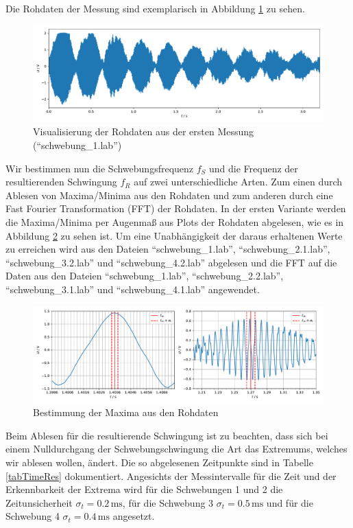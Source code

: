 Die Rohdaten der Messung sind exemplarisch in Abbildung \ref{rohSch} zu sehen.

\begin{figure}[h]
	\centering
	\includegraphics[width=\linewidth]{plots/rohdaten_schwebung.pdf}
	\caption{Visualisierung der Rohdaten aus der ersten Messung (\mbox{``schwebung\_1.lab''})}
	\label{rohSch}
\end{figure}

Wir bestimmen nun die Schwebungsfrequenz $f_S$ und die Frequenz der resultierenden Schwingung $f_R$ auf zwei unterschiedliche Arten. Zum einen durch Ablesen von Maxima/Minima aus den Rohdaten und zum anderen durch eine Fast Fourier Transformation (FFT) der Rohdaten. 
In der ersten Variante werden die Maxima/Minima per Augenmaß aus Plots der Rohdaten abgelesen, wie es in Abbildung \ref{MaxAblesen} zu sehen ist. Um eine Unabhängigkeit der daraus erhaltenen Werte zu erreichen wird aus den Dateien \mbox{``schwebung\_1.lab''}, \mbox{``schwebung\_2.1.lab''}, \mbox{``schwebung\_3.2.lab''} und \mbox{``schwebung\_4.2.lab''} abgelesen und die FFT auf die Daten aus den Dateien \mbox{``schwebung\_1.lab''}, \mbox{``schwebung\_2.2.lab''}, \\
\mbox{``schwebung\_3.1.lab''} und \mbox{``schwebung\_4.1.lab''} angewendet.

\begin{figure}[H]
	\centering
	\includegraphics[width=\linewidth]{plots/bspMaxima.pdf}
	\caption{Bestimmung der Maxima aus den Rohdaten}
	\label{MaxAblesen}
\end{figure}
Beim Ablesen für die resultierende Schwingung ist zu beachten, dass sich bei einem Nulldurchgang der Schwebungschwingung die Art das Extremums, welches wir ablesen wollen, ändert. Die so abgelesenen Zeitpunkte sind in Tabelle \ref{tabTimeRes} dokumentiert. Angesichts der Messintervalle für die Zeit und der Erkennbarkeit der Extrema wird für die Schwebungen 1 und 2 die Zeitunsicherheit $\sigma_t = 0.2 \, \mathrm{ms}$, für die Schwebung 3 $\sigma_t = 0.5 \, \mathrm{ms}$ und für die Schwebung 4 $\sigma_t = 0.4 \, \mathrm{ms}$ angesetzt.

